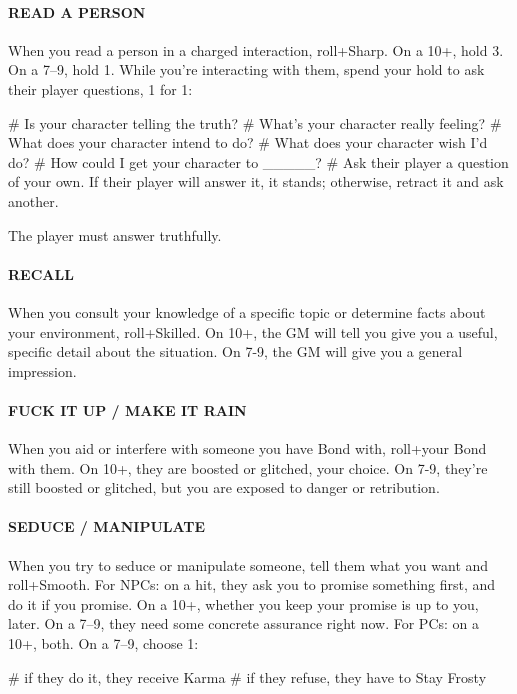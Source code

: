 \paragraph{READ A PERSON}
When you read a person in a charged interaction, roll+Sharp. On a 10+, hold 3. On a 7–9, hold 1. While you’re interacting with them, spend your hold to ask their player questions, 1 for 1:

\begin{easylist}
# Is your character telling the truth?
# What’s your character really feeling?
# What does your character intend to do?
# What does your character wish I’d do?
# How could I get your character to \_\_\_\_\_?
# Ask their player a question of your own. If their player will answer it, it stands; otherwise, retract it and ask another.
\end{easylist}

The player must answer truthfully.


\paragraph{RECALL}
When you consult your knowledge of a specific topic or determine facts about your environment, roll+Skilled. On 10+, the GM will tell you give you a useful, specific detail about the situation. On 7-9, the GM will give you a general impression.

\paragraph{FUCK IT UP / MAKE IT RAIN}
When you aid or interfere with someone you have Bond with, roll+your Bond with them. On 10+, they are boosted or glitched, your choice. On 7-9, they’re still boosted or glitched, but you are exposed to danger or retribution.

\paragraph{SEDUCE / MANIPULATE}
When you try to seduce or manipulate someone, tell them what you want and roll+Smooth.
For NPCs: on a hit, they ask you to promise something first, and do it if you promise. On a 10+, whether you keep your promise is up to you, later. On a 7–9, they need some concrete assurance right now.
For PCs: on a 10+, both. On a 7–9, choose 1:

\begin{easylist}
# if they do it, they receive Karma
# if they refuse, they have to Stay Frosty    
\end{easylist}


